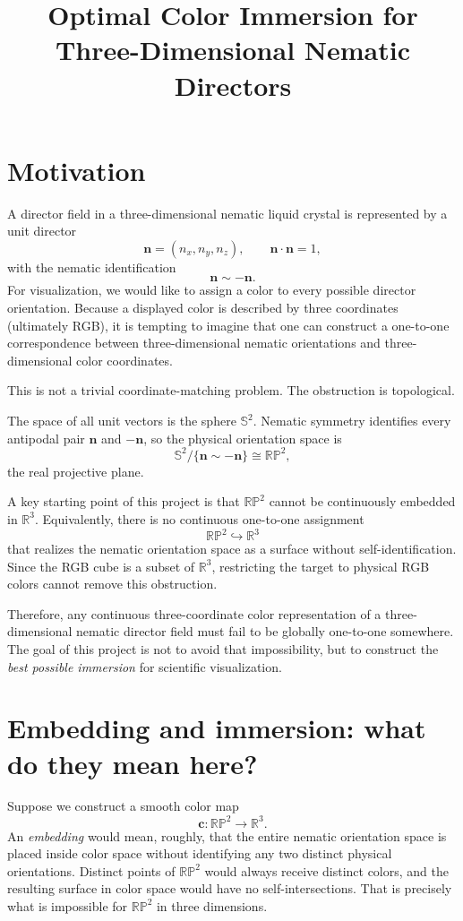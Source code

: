 \documentclass[11pt]{article}
\title{Optimal Color Immersion for Three-Dimensional Nematic Directors}
\author{}
\date{}
\newcommand{\RP}{\mathbb{RP}}
\newcommand{\RR}{\mathbb{R}}
\newcommand{\SSph}{\mathbb{S}}
\newcommand{\vect}[1]{\mathbf{#1}}
\begin{document}
\maketitle

\section{Motivation}

A director field in a three-dimensional nematic liquid crystal is represented by a unit director
\[
\vect n=(n_x,n_y,n_z),\qquad \vect n\cdot\vect n=1,
\]
with the nematic identification
\[
\vect n\sim-\vect n.
\]
For visualization, we would like to assign a color to every possible director orientation. Because a displayed color is described by three coordinates (ultimately RGB), it is tempting to imagine that one can construct a one-to-one correspondence between three-dimensional nematic orientations and three-dimensional color coordinates.

This is not a trivial coordinate-matching problem. The obstruction is topological.

The space of all unit vectors is the sphere $\SSph^2$. Nematic symmetry identifies every antipodal pair $\vect n$ and $-\vect n$, so the physical orientation space is
\[
\SSph^2/\{\vect n\sim-\vect n\}\cong\RP^2,
\]
the real projective plane.

A key starting point of this project is that $\RP^2$ cannot be continuously embedded in $\RR^3$. Equivalently, there is no continuous one-to-one assignment
\[
\RP^2\hookrightarrow\RR^3
\]
that realizes the nematic orientation space as a surface without self-identification. Since the RGB cube is a subset of $\RR^3$, restricting the target to physical RGB colors cannot remove this obstruction.

Therefore, any continuous three-coordinate color representation of a three-dimensional nematic director field must fail to be globally one-to-one somewhere. The goal of this project is not to avoid that impossibility, but to construct the \emph{best possible immersion} for scientific visualization.

\section{Embedding and immersion: what do they mean here?}

Suppose we construct a smooth color map
\[
\vect c:\RP^2\longrightarrow\RR^3.
\]
An \emph{embedding} would mean, roughly, that the entire nematic orientation space is placed inside color space without identifying any two distinct physical orientations. Distinct points of $\RP^2$ would always receive distinct colors, and the resulting surface in color space would have no self-intersections. That is precisely what is impossible for $\RP^2$ in three dimensions.
\end{document}
